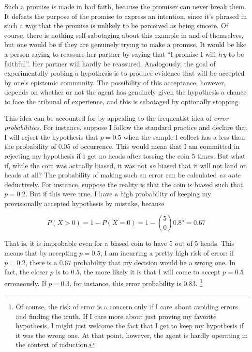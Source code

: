 Such a promise is made in bad faith, because the promiser can never break them. It defeats the purpose of the promise to express an intention, since it's phrased in such a way that the promise is unlikely to be perceived as being sincere. Of course, there is nothing self-sabotaging about this example in and of themselves, but one would be if they are genuinely trying to make a promise. It would be like a person saying to reassure her partner by saying that ``I promise I will \emph{try} to be faithful''. Her partner will hardly be reassured. Analogously, the goal of experimentally probing a hypothesis is to produce evidence that will be accepted by one's epistemic community. The possibility of this acceptance, however, depends on whether or not the agent has genuinely given the hypothesis a chance to face the tribunal of experience, and this is sabotaged by optionally stopping. 

%

This idea can be accounted for by appealing to the frequentist idea of \emph{error probabilities}. For instance,
suppose I follow the standard practice and declare that I will reject
the hypothesis that \(p=0.5\) when the sample I collect has a less than
the probability of \(0.05\) of occurrence. This would mean that I am
committed in rejecting my hypothesis if I get no heads after tossing
the coin 5 times. But what if, while the coin was actually biased, 
 it was not \emph{so} biased that it will not land on heads at all? The probability of
making such an error can be calculated \emph{ex ante} deductively. For
instance, suppose the reality is that the coin is biased such that
\(p=0.2\). But if this were true, I have a high probability of keeping
my provisionally accepted hypothesis by mistake, because

\[P(X > 0) = 1 - P(X=0) = 1 - {5 \choose 0} 0.8^5 = 0.67\]

That is, it is improbable even for a biased coin to have 5 out of 5 heads. This means that by accepting \(p=0.5\), I am incurring a pretty high
risk of error: if \(p=0.2\), there is a 0.67 probability that my decision would be a wrong one. In fact, the closer \(p\) is to \(0.5\), the more likely it is
that I will come to accept \(p=0.5\) erroneously. If \(p=0.3\), for
instance, this error probability is \(0.83\). \footnote{Of course, the
risk of error is a concern only if I care about avoiding errors and finding the truth. If I care more about just proving my favorite hypothesis, I might just welcome the fact that I get to keep my hypothesis if it was the wrong one. At that point, however, the agent is hardly operating in the context of induction. }



